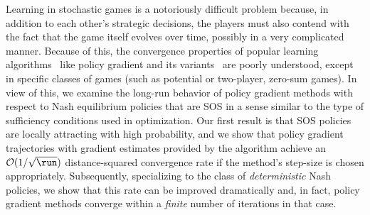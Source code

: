 %
%
Learning in stochastic games is a notoriously difficult problem because, in addition to each other's strategic decisions, the players must also contend with the fact that the game itself evolves over time, possibly in a very complicated manner.
Because of this, the convergence properties of popular learning algorithms \textendash\ like policy gradient and its variants \textendash\ are poorly understood, except in specific classes of games (such as potential or two-player, zero-sum games).
In view of this, we examine the long-run behavior of policy gradient methods with respect to Nash equilibrium policies that are \acf{SOS} in a sense similar to the type of sufficiency conditions used in optimization.
Our first result is that \ac{SOS} policies are locally attracting with high probability, and we show that policy gradient trajectories with gradient estimates provided by the \reinforce algorithm achieve an $\mathcal{O}(1/\sqrt{\run})$ distance-squared convergence rate if the method's step-size is chosen appropriately.
Subsequently, specializing to the class of \emph{deterministic} Nash policies, we show that this rate can be improved dramatically and, in fact, policy gradient methods converge within a \emph{finite} number of iterations in that case.
